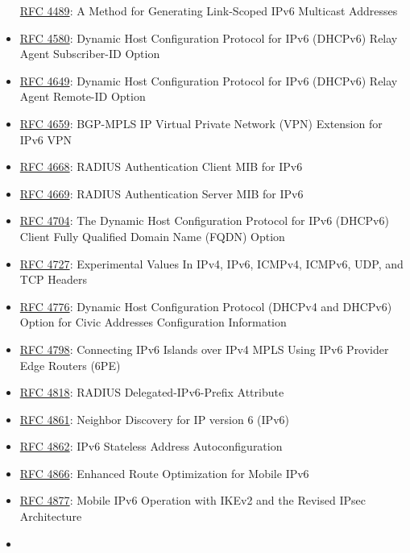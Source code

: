 \documentclass[
]{article}
\begin{document}
\begin{itemize}
  \href{https://www.rfc-editor.org/info/rfc4489}{RFC 4489}: A Method for
  Generating Link-Scoped IPv6 Multicast Addresses
\item
  \href{https://www.rfc-editor.org/info/rfc4580}{RFC 4580}: Dynamic Host
  Configuration Protocol for IPv6 (DHCPv6) Relay Agent Subscriber-ID
  Option
\item
  \href{https://www.rfc-editor.org/info/rfc4649}{RFC 4649}: Dynamic Host
  Configuration Protocol for IPv6 (DHCPv6) Relay Agent Remote-ID Option
\item
  \href{https://www.rfc-editor.org/info/rfc4659}{RFC 4659}: BGP-MPLS IP
  Virtual Private Network (VPN) Extension for IPv6 VPN
\item
  \href{https://www.rfc-editor.org/info/rfc4668}{RFC 4668}: RADIUS
  Authentication Client MIB for IPv6
\item
  \href{https://www.rfc-editor.org/info/rfc4669}{RFC 4669}: RADIUS
  Authentication Server MIB for IPv6
\item
  \href{https://www.rfc-editor.org/info/rfc4704}{RFC 4704}: The Dynamic
  Host Configuration Protocol for IPv6 (DHCPv6) Client Fully Qualified
  Domain Name (FQDN) Option
\item
  \href{https://www.rfc-editor.org/info/rfc4727}{RFC 4727}: Experimental
  Values In IPv4, IPv6, ICMPv4, ICMPv6, UDP, and TCP Headers
\item
  \href{https://www.rfc-editor.org/info/rfc4776}{RFC 4776}: Dynamic Host
  Configuration Protocol (DHCPv4 and DHCPv6) Option for Civic Addresses
  Configuration Information
\item
  \href{https://www.rfc-editor.org/info/rfc4798}{RFC 4798}: Connecting
  IPv6 Islands over IPv4 MPLS Using IPv6 Provider Edge Routers (6PE)
\item
  \href{https://www.rfc-editor.org/info/rfc4818}{RFC 4818}: RADIUS
  Delegated-IPv6-Prefix Attribute
\item
  \href{https://www.rfc-editor.org/info/rfc4861}{RFC 4861}: Neighbor
  Discovery for IP version 6 (IPv6)
\item
  \href{https://www.rfc-editor.org/info/rfc4862}{RFC 4862}: IPv6
  Stateless Address Autoconfiguration
\item
  \href{https://www.rfc-editor.org/info/rfc4866}{RFC 4866}: Enhanced
  Route Optimization for Mobile IPv6
\item
  \href{https://www.rfc-editor.org/info/rfc4877}{RFC 4877}: Mobile IPv6
  Operation with IKEv2 and the Revised IPsec Architecture
\item

\end{itemize}
\end{document}
